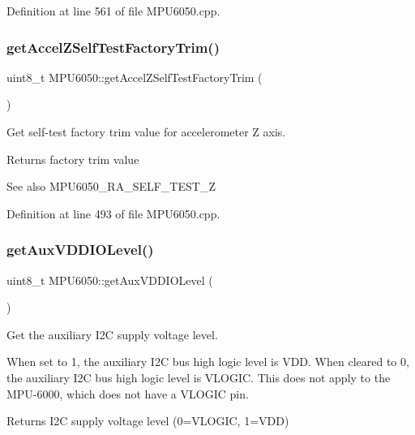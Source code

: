 Definition at line 561 of file M\+P\+U6050.\+cpp.

\mbox{\label{classMPU6050_a455f63be2ea810cac26d583da6915050}} 
\subsubsection{\texorpdfstring{getAccelZSelfTestFactoryTrim()}{getAccelZSelfTestFactoryTrim()}}
{\footnotesize\ttfamily uint8\+\_\+t M\+P\+U6050\+::get\+Accel\+Z\+Self\+Test\+Factory\+Trim (\begin{DoxyParamCaption}{ }\end{DoxyParamCaption})}



Get self-\/test factory trim value for accelerometer Z axis. 

\begin{DoxyReturn}{Returns}
factory trim value 
\end{DoxyReturn}
\begin{DoxySeeAlso}{See also}
M\+P\+U6050\+\_\+\+R\+A\+\_\+\+S\+E\+L\+F\+\_\+\+T\+E\+S\+T\+\_\+Z 
\end{DoxySeeAlso}


Definition at line 493 of file M\+P\+U6050.\+cpp.

\mbox{\label{classMPU6050_af6e9af8e2222889fd5458e2ae12c55c8}} 
\subsubsection{\texorpdfstring{getAuxVDDIOLevel()}{getAuxVDDIOLevel()}}
{\footnotesize\ttfamily uint8\+\_\+t M\+P\+U6050\+::get\+Aux\+V\+D\+D\+I\+O\+Level (\begin{DoxyParamCaption}{ }\end{DoxyParamCaption})}



Get the auxiliary I2C supply voltage level. 

When set to 1, the auxiliary I2C bus high logic level is V\+DD. When cleared to 0, the auxiliary I2C bus high logic level is V\+L\+O\+G\+IC. This does not apply to the M\+P\+U-\/6000, which does not have a V\+L\+O\+G\+IC pin. \begin{DoxyReturn}{Returns}
I2C supply voltage level (0=V\+L\+O\+G\+IC, 1=V\+DD) 
\end{DoxyReturn}


